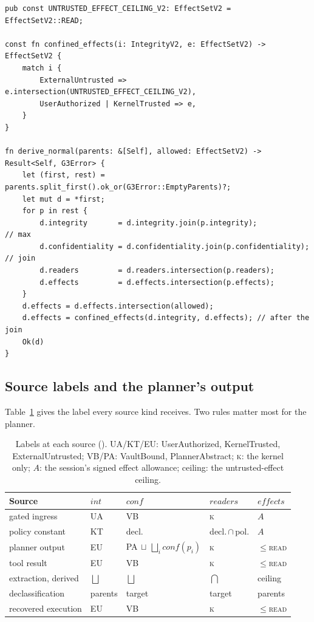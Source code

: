 \documentclass[letterpaper,twocolumn,10pt]{article}
\newcommand{\code}[1]{\texttt{\detokenize{#1}}}
\newcommand{\READ}{\textsc{read}}
\newcommand{\integ}{\mathit{int}}
\newcommand{\conf}{\mathit{conf}}
\newcommand{\readers}{\mathit{readers}}
\newcommand{\effects}{\mathit{effects}}
\begin{document}
\begin{lstlisting}[caption={Label derivation (abridged from \code{labels.rs}). The ceiling is re-applied after the join.},label={lst:derive},float=t]
pub const UNTRUSTED_EFFECT_CEILING_V2: EffectSetV2 = EffectSetV2::READ;

const fn confined_effects(i: IntegrityV2, e: EffectSetV2) -> EffectSetV2 {
    match i {
        ExternalUntrusted => e.intersection(UNTRUSTED_EFFECT_CEILING_V2),
        UserAuthorized | KernelTrusted => e,
    }
}

fn derive_normal(parents: &[Self], allowed: EffectSetV2) -> Result<Self, G3Error> {
    let (first, rest) = parents.split_first().ok_or(G3Error::EmptyParents)?;
    let mut d = *first;
    for p in rest {
        d.integrity       = d.integrity.join(p.integrity);             // max
        d.confidentiality = d.confidentiality.join(p.confidentiality); // join
        d.readers         = d.readers.intersection(p.readers);
        d.effects         = d.effects.intersection(p.effects);
    }
    d.effects = d.effects.intersection(allowed);
    d.effects = confined_effects(d.integrity, d.effects); // after the join
    Ok(d)
}
\end{lstlisting}

\subsection{Source labels and the planner's output}
\label{sec:source-labels}

Table~\ref{tab:sources} gives the label every source kind receives. Two
rules matter most for the planner.

\begin{table}[t]
\centering\scriptsize
\begin{tabularx}{\columnwidth}{@{}Xllll@{}}
\toprule
\textbf{Source} & $\integ$ & $\conf$ & $\readers$ & $\effects$\\
\midrule
gated ingress & UA & VB & \textsc{k} & $A$\\
policy constant & KT & decl. & decl.\,$\cap$\,pol. & $A$\\
planner output & EU & PA$\,\sqcup\,\bigsqcup_i\conf(p_i)$ & \textsc{k} & $\le$\READ\\
tool result & EU & VB & \textsc{k} & $\le$\READ\\
extraction, derived & $\bigsqcup$ & $\bigsqcup$ & $\bigcap$ & ceiling\\
declassification & parents & target & target & parents\\
recovered execution & EU & VB & \textsc{k} & $\le$\READ\\
\bottomrule
\end{tabularx}
\caption{Labels at each source (\code{provenance.rs}). UA/KT/EU:
\textsf{UserAuthorized}, \textsf{KernelTrusted}, \textsf{ExternalUntrusted};
VB/PA: \textsf{VaultBound}, \textsf{PlannerAbstract}; \textsc{k}: the
kernel only; $A$: the session's signed effect allowance; ceiling: the
untrusted-effect ceiling.}
\label{tab:sources}
\end{table}
\end{document}
